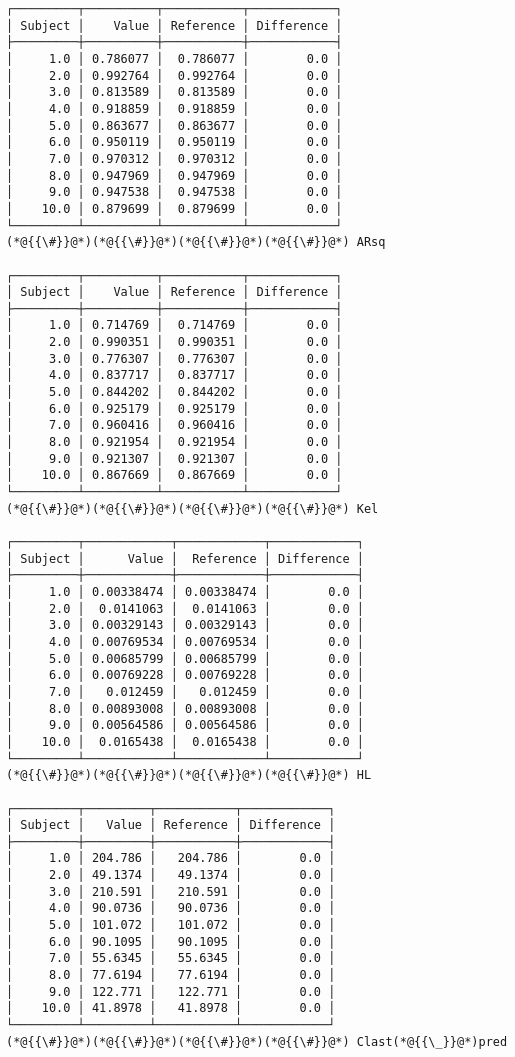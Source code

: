 \documentclass[12pt,a4paper]{article}
\begin{document}
\begin{lstlisting}
┌─────────┬──────────┬───────────┬────────────┐
│ Subject │    Value │ Reference │ Difference │
├─────────┼──────────┼───────────┼────────────┤
│     1.0 │ 0.786077 │  0.786077 │        0.0 │
│     2.0 │ 0.992764 │  0.992764 │        0.0 │
│     3.0 │ 0.813589 │  0.813589 │        0.0 │
│     4.0 │ 0.918859 │  0.918859 │        0.0 │
│     5.0 │ 0.863677 │  0.863677 │        0.0 │
│     6.0 │ 0.950119 │  0.950119 │        0.0 │
│     7.0 │ 0.970312 │  0.970312 │        0.0 │
│     8.0 │ 0.947969 │  0.947969 │        0.0 │
│     9.0 │ 0.947538 │  0.947538 │        0.0 │
│    10.0 │ 0.879699 │  0.879699 │        0.0 │
└─────────┴──────────┴───────────┴────────────┘
(*@{{\#}}@*)(*@{{\#}}@*)(*@{{\#}}@*)(*@{{\#}}@*) ARsq

┌─────────┬──────────┬───────────┬────────────┐
│ Subject │    Value │ Reference │ Difference │
├─────────┼──────────┼───────────┼────────────┤
│     1.0 │ 0.714769 │  0.714769 │        0.0 │
│     2.0 │ 0.990351 │  0.990351 │        0.0 │
│     3.0 │ 0.776307 │  0.776307 │        0.0 │
│     4.0 │ 0.837717 │  0.837717 │        0.0 │
│     5.0 │ 0.844202 │  0.844202 │        0.0 │
│     6.0 │ 0.925179 │  0.925179 │        0.0 │
│     7.0 │ 0.960416 │  0.960416 │        0.0 │
│     8.0 │ 0.921954 │  0.921954 │        0.0 │
│     9.0 │ 0.921307 │  0.921307 │        0.0 │
│    10.0 │ 0.867669 │  0.867669 │        0.0 │
└─────────┴──────────┴───────────┴────────────┘
(*@{{\#}}@*)(*@{{\#}}@*)(*@{{\#}}@*)(*@{{\#}}@*) Kel

┌─────────┬────────────┬────────────┬────────────┐
│ Subject │      Value │  Reference │ Difference │
├─────────┼────────────┼────────────┼────────────┤
│     1.0 │ 0.00338474 │ 0.00338474 │        0.0 │
│     2.0 │  0.0141063 │  0.0141063 │        0.0 │
│     3.0 │ 0.00329143 │ 0.00329143 │        0.0 │
│     4.0 │ 0.00769534 │ 0.00769534 │        0.0 │
│     5.0 │ 0.00685799 │ 0.00685799 │        0.0 │
│     6.0 │ 0.00769228 │ 0.00769228 │        0.0 │
│     7.0 │   0.012459 │   0.012459 │        0.0 │
│     8.0 │ 0.00893008 │ 0.00893008 │        0.0 │
│     9.0 │ 0.00564586 │ 0.00564586 │        0.0 │
│    10.0 │  0.0165438 │  0.0165438 │        0.0 │
└─────────┴────────────┴────────────┴────────────┘
(*@{{\#}}@*)(*@{{\#}}@*)(*@{{\#}}@*)(*@{{\#}}@*) HL

┌─────────┬─────────┬───────────┬────────────┐
│ Subject │   Value │ Reference │ Difference │
├─────────┼─────────┼───────────┼────────────┤
│     1.0 │ 204.786 │   204.786 │        0.0 │
│     2.0 │ 49.1374 │   49.1374 │        0.0 │
│     3.0 │ 210.591 │   210.591 │        0.0 │
│     4.0 │ 90.0736 │   90.0736 │        0.0 │
│     5.0 │ 101.072 │   101.072 │        0.0 │
│     6.0 │ 90.1095 │   90.1095 │        0.0 │
│     7.0 │ 55.6345 │   55.6345 │        0.0 │
│     8.0 │ 77.6194 │   77.6194 │        0.0 │
│     9.0 │ 122.771 │   122.771 │        0.0 │
│    10.0 │ 41.8978 │   41.8978 │        0.0 │
└─────────┴─────────┴───────────┴────────────┘
(*@{{\#}}@*)(*@{{\#}}@*)(*@{{\#}}@*)(*@{{\#}}@*) Clast(*@{{\_}}@*)pred


\end{lstlisting}
\end{document}
